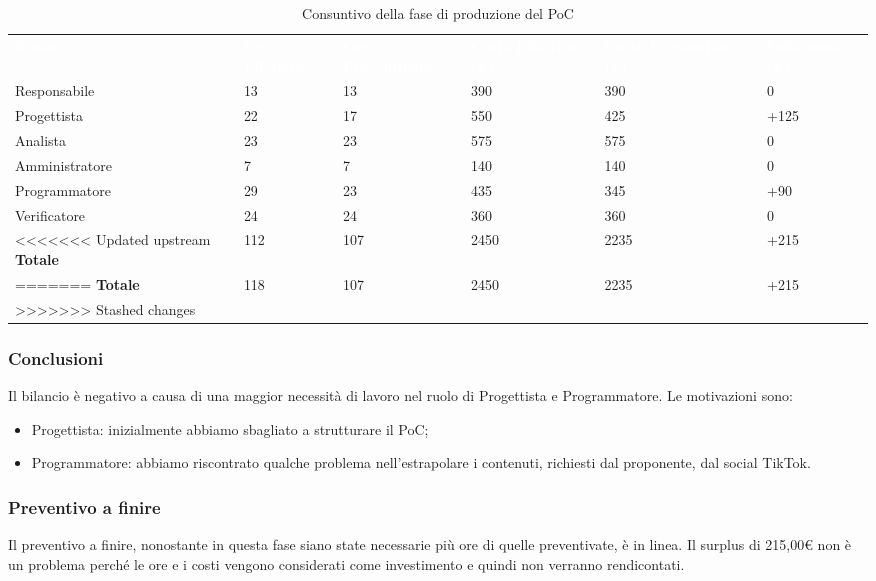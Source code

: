 \begin{table}[!htbp]
\begin{center}
\renewcommand{\arraystretch}{1.5}
\begin{tabular}{ m{}<{\centering}  m{}<{\centering} m{}<{\centering} m{}<{\centering} m{}<{\centering} m{}<{\centering}}
	\rowcolor{darkblue}
	\textcolor{white}{\textbf{Ruolo}} & \textcolor{white}{\textbf{Ore Effettive}} & \textcolor{white}{\textbf{Ore Preventivate}}&\textcolor{white}{\textbf{Costo Effettivo (\euro) }}&\textcolor{white}{\textbf{Costo Preventivato (\euro)}}&\textcolor{white}{\textbf{Differenza (\euro)}}\\ 
	Responsabile  & 13 & 13 & 390 & 390 & 0\\	
	
	Progettista & 22 & 17 & 550 & 425 & +125\\
	
	Analista & 23 & 23 & 575 & 575 & 0\\
	
	Amministratore & 7 & 7 & 140 & 140 & 0\\
	
	Programmatore & 29 & 23 & 435 & 345 &  +90\\
	
	Verificatore & 24 & 24 & 360 & 360 & 0\\
	
<<<<<<< Updated upstream
	\textbf{Totale} & 112 & 107 & 2450 & 2235 & +215\\
=======
	\textbf{Totale} & 118 & 107 & 2450 & 2235 & +215\\
>>>>>>> Stashed changes
	
\end{tabular}
\caption{Consuntivo della fase di produzione del PoC}
\end{center}
\end{table}

\subsubsection{Conclusioni}
Il bilancio è negativo a causa di una maggior necessità di lavoro nel ruolo di Progettista e Programmatore.  Le motivazioni sono:
\begin{itemize}
\item Progettista: inizialmente abbiamo sbagliato a strutturare il PoC;
\item Programmatore: abbiamo riscontrato qualche problema nell'estrapolare i contenuti,  richiesti dal proponente,  dal social TikTok.
\end{itemize}

\subsubsection{Preventivo a finire}
Il preventivo a finire,  nonostante in questa fase siano state necessarie più ore di quelle preventivate,  è in linea.  Il surplus di 215,00\euro \xspace non è un problema perché le ore e i costi vengono considerati come investimento e quindi non verranno rendicontati.